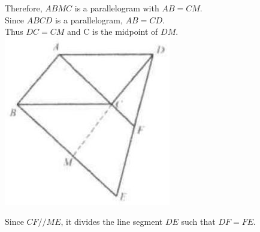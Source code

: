 \documentclass{article}
\begin{document}
Therefore, \(A B M C\) is a parallelogram with \(A B=C M\).\\
Since \(A B C D\) is a parallelogram, \(A B=C D\).\\
Thus \(D C=C M\) and C is the midpoint of \(D M\).\\
\centering
\includegraphics[width=\textwidth]{images/038(1).jpg}

Since \(C F / / M E\), it divides the line segment \(D E\) such that \(D F=F E\).\\
\end{document}

